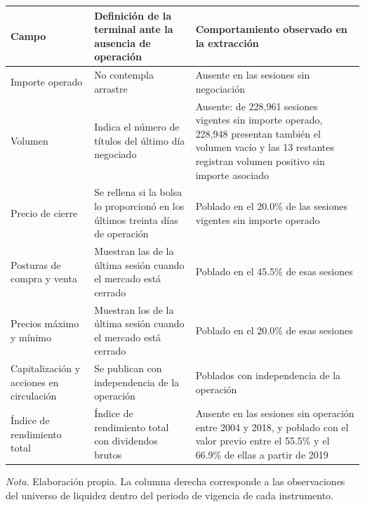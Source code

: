 {\small
\begin{longtable}[]{@{}
  >{\raggedright\arraybackslash}p{}
  >{\raggedright\arraybackslash}p{}
  >{\raggedright\arraybackslash}p{}@{}}
\toprule\noalign{}
\begin{minipage}[b]{\linewidth}\raggedright
\textbf{Campo}
\end{minipage} & \begin{minipage}[b]{\linewidth}\raggedright
\textbf{Definición de la terminal ante la ausencia de operación}
\end{minipage} & \begin{minipage}[b]{\linewidth}\raggedright
\textbf{Comportamiento observado en la extracción}
\end{minipage} \\
\midrule\noalign{}
\endhead
\bottomrule\noalign{}
\endlastfoot
Importe operado & No contempla arrastre & Ausente en las sesiones sin negociación \\
Volumen & Indica el número de títulos del último día negociado & Ausente: de 228,961 sesiones vigentes sin importe operado, 228,948 presentan también el volumen vacío y las 13 restantes registran volumen positivo sin importe asociado \\
Precio de cierre & Se rellena si la bolsa lo proporcionó en los últimos treinta días de operación & Poblado en el 20.0\% de las sesiones vigentes sin importe operado \\
Posturas de compra y venta & Muestran las de la última sesión cuando el mercado está cerrado & Poblado en el 45.5\% de esas sesiones \\
Precios máximo y mínimo & Muestran los de la última sesión cuando el mercado está cerrado & Poblado en el 20.0\% de esas sesiones \\
Capitalización y acciones en circulación & Se publican con independencia de la operación & Poblados con independencia de la operación \\
Índice de rendimiento total & Índice de rendimiento total con dividendos brutos & Ausente en las sesiones sin operación entre 2004 y 2018, y poblado con el valor previo entre el 55.5\% y el 66.9\% de ellas a partir de 2019 \\
\end{longtable}
}

\emph{Nota.} Elaboración propia. La columna derecha corresponde a las observaciones del universo de liquidez dentro del periodo de vigencia de cada instrumento.

